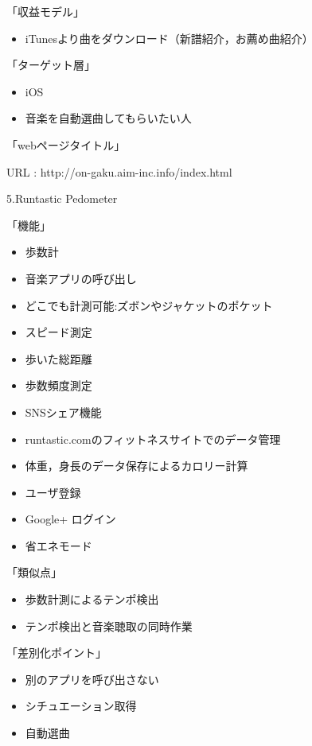 「収益モデル」
\begin{itemize}
\item iTunesより曲をダウンロード（新譜紹介，お薦め曲紹介）
\end{itemize}

「ターゲット層」
\begin{itemize}
\item iOS
\item 音楽を自動選曲してもらいたい人
\end{itemize}
「webページタイトル」
\par
URL : http://on-gaku.aim-inc.info/index.html
\\
\par
5.Runtastic Pedometer
\par
「機能」
\begin{itemize}
\item 歩数計
\item 音楽アプリの呼び出し
\item どこでも計測可能:ズボンやジャケットのポケット
\item スピード測定
\item 歩いた総距離
\item 歩数頻度測定
\item SNSシェア機能
\item runtastic.comのフィットネスサイトでのデータ管理
\item 体重，身長のデータ保存によるカロリー計算
\item ユーザ登録
\item Google+ ログイン
\item 省エネモード
\end{itemize}

「類似点」
\begin{itemize}
\item 歩数計測によるテンポ検出
\item テンポ検出と音楽聴取の同時作業
\end{itemize}

「差別化ポイント」
\begin{itemize}
\item 別のアプリを呼び出さない
\item シチュエーション取得
\item 自動選曲
\end{itemize}

